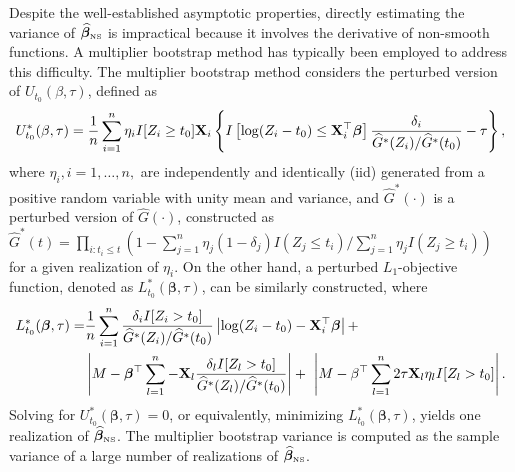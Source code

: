 Despite the well-established asymptotic properties, directly estimating the variance of $\widehat{\bm{\beta}}_{\tiny\mbox{NS}}$ is impractical 
because it involves the derivative of non-smooth functions. 
A multiplier bootstrap method has typically been employed \citep{li2016quantile} to address this difficulty.
The multiplier bootstrap method considers the perturbed version of $U_{t_0}(\beta, \tau)$, defined as
\begin{equation*} 
  \label{eq:nsm:rev}
  U_{t_0}^{\ast}(\beta, \tau) = \frac{1}{n}\sum_{i=1}^{n} \eta_i I[Z_i \ge t_0] \mathbf{X}_i  \left\{I \left[\log(Z_i - t_0) \leq \mathbf{X}_i^{\top} \bm{\beta} \right]\frac{\delta_i}{\widehat{G}^{\ast}(Z_i)/\widehat{G}^{\ast}(t_0)}  -\tau \right\},
\end{equation*}
where $\eta_i, i = 1, \ldots, n, $ are independently and identically (iid)
generated from a positive random variable with unity mean and variance, 
and $\widehat{G}^\ast(\cdot)$ is a perturbed version of $\widehat{G}(\cdot)$, 
constructed as
$\widehat{G}^\ast(t) = 
\prod_{i: t_i \leq t} (1 - \sum_{j=1}^n \eta_j(1 - \delta_j)I(Z_j \leq t_i) / \sum_{j=1}^n \eta_jI(Z_j \geq t_i))$
for a given realization of $\eta_i$.
On the other hand, a perturbed $L_1$-objective function, denoted as $L_{t_0}^{\ast}(\bm{\beta}, \tau)$, 
can be similarly constructed, where
\begin{align*}
  L_{t_0}^{\ast}(\bm{\beta}, \tau) = & \frac{1}{n}\sum_{i=1}^n \frac{\delta_i I[Z_i > t_0]}{\widehat{G}^{\ast}(Z_i)/\widehat{G}^{\ast}(t_0)} \left| \log(Z_i - t_0) - \mathbf{X}_i^{\top}\bm{\beta} \right| + \nonumber \\
                                     & \left| M - \bm{\beta}^{\top}\sum_{l=1}^n - \mathbf{X}_l \frac{\delta_l I[Z_l > t_0]}{\widehat{G}^{\ast}(Z_l)/\widehat{G}^{\ast}(t_0)}\right| 
                                       + \ \left| M - \beta^{\top}\sum_{l=1}^n 2\tau \mathbf{X}_l \eta_l I[Z_l > t_0]\right|.
\end{align*} 
Solving for $U_{t_0}^{\ast}(\bm{\beta}, \tau) = 0$, or equivalently, 
minimizing $L_{t_0}^{\ast}(\bm{\beta}, \tau)$, yields one realization of $\widehat{\bm{\beta}}_{\tiny\mbox{NS}}$. 
The multiplier bootstrap variance is computed as the sample variance of 
a large number of realizations of $\widehat{\bm{\beta}}_{\tiny\mbox{NS}}$.

